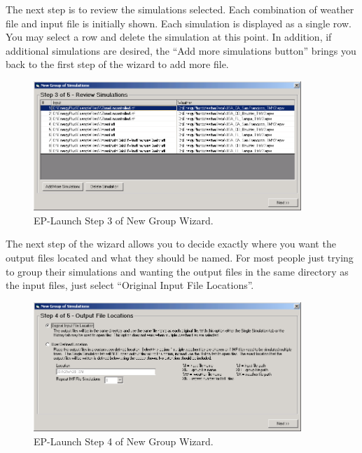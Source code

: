The next step is to review the simulations selected. Each combination of weather file and input file is initially shown. Each simulation is displayed as a single row. You may select a row and delete the simulation at this point. In addition, if additional simulations are desired, the ``Add more simulations button'' brings you back to the first step of the wizard to add more file.

\begin{figure}[hbtp] %
\centering
\includegraphics[width=0.9\textwidth, height=0.9\textheight, keepaspectratio=true]{media/image110.png}
\caption{EP-Launch Step 3 of New Group Wizard. \protect \label{fig:ep-launch-step-3-of-new-group-wizard.}}
\end{figure}

The next step of the wizard allows you to decide exactly where you want the output files located and what they should be named. For most people just trying to group their simulations and wanting the output files in the same directory as the input files, just select ``Original Input File Locations''.

\begin{figure}[hbtp] %
\centering
\includegraphics[width=0.9\textwidth, height=0.9\textheight, keepaspectratio=true]{media/image111.png}
\caption{EP-Launch Step 4 of New Group Wizard. \protect \label{fig:ep-launch-step-4-of-new-group-wizard.}}
\end{figure}

